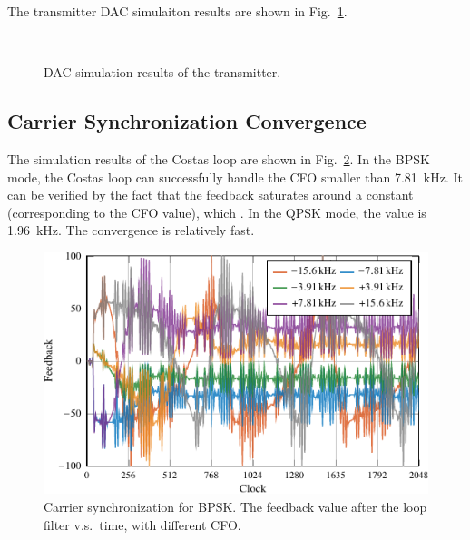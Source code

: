 \documentclass[journal,twoside]{IEEEtran}
\begin{document}
      The transmitter DAC simulaiton results are shown in Fig.~\ref{fig:tx_dac_sim}.
      \begin{figure}[h]
        \setlength{\tabcolsep}{2pt}
        \\
        \caption{DAC simulation results of the transmitter.}
        \label{fig:tx_dac_sim}
      \end{figure}

    \subsection{Carrier Synchronization Convergence}\label{subsec:costas_convergence}

      The simulation results of the Costas loop are shown in Fig.~\ref{fig:sync_BPSK}.
      In the BPSK mode, the Costas loop can successfully handle the CFO smaller than \qty{7.81}{kHz}.
      It can be verified by the fact that the feedback saturates around a constant (corresponding to the CFO value),
      which .
      In the QPSK mode, the value is \qty{1.96}{kHz}.
      The convergence is relatively fast.
      \begin{figure}[htbp]
        \centering
        \includegraphics{_tikz_sim_sync_BPSK-crop.pdf}
        \caption{Carrier synchronization for BPSK. The feedback value after the loop filter v.s.\ time, with different CFO.}
        \label{fig:sync_BPSK}
      \end{figure}
      
\end{document}

